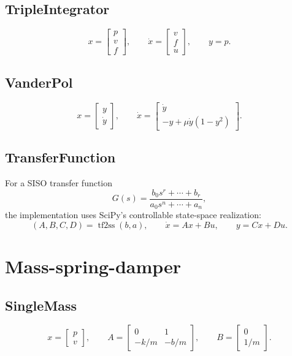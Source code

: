 \documentclass[11pt]{article}
\begin{document}
\subsection{TripleIntegrator}
\begin{equation}
    x = \begin{bmatrix} p \\ v \\ f \end{bmatrix},
    \qquad
    \dot x = \begin{bmatrix} v \\ f \\ u \end{bmatrix},
    \qquad
    y = p.
\end{equation}

\subsection{VanderPol}
\begin{equation}
    x = \begin{bmatrix} y \\ \dot y \end{bmatrix},
    \qquad
    \dot x =
    \begin{bmatrix}
        \dot y \\
        -y + \mu \dot y(1-y^2)
    \end{bmatrix}.
\end{equation}

\subsection{TransferFunction}
For a SISO transfer function
\begin{equation}
    G(s) = \frac{b_0s^r + \cdots + b_r}{a_0s^n + \cdots + a_n},
\end{equation}
the implementation uses SciPy's controllable state-space realization:
\begin{equation}
    (A,B,C,D) = \operatorname{tf2ss}(b,a),
    \qquad
    \dot x = Ax + Bu,
    \qquad
    y = Cx + Du.
\end{equation}

\section{Mass-spring-damper}

\subsection{SingleMass}
\begin{equation}
    x = \begin{bmatrix} p \\ v \end{bmatrix},
    \qquad
    A =
    \begin{bmatrix}
        0 & 1 \\
        -k/m & -b/m
    \end{bmatrix},
    \qquad
    B = \begin{bmatrix}0 \\ 1/m\end{bmatrix}.
\end{equation}
\end{document}
